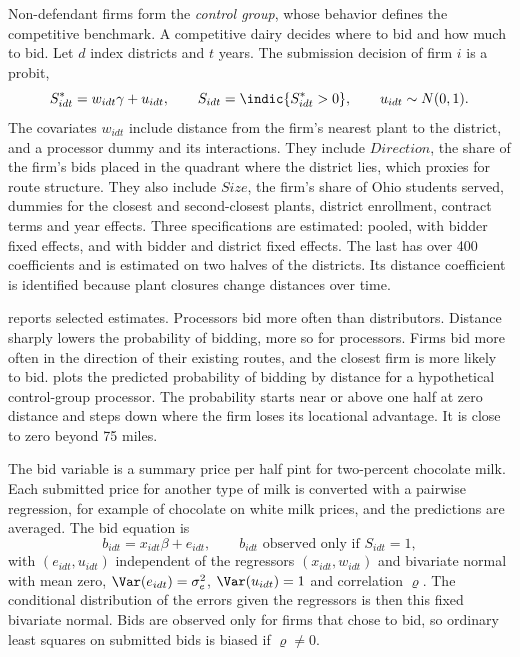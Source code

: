 Non-defendant firms form the \emph{control group}, whose behavior defines the competitive benchmark. A competitive
dairy decides where to bid and how much to bid. Let $d$ index districts and $t$ years. The submission decision of
firm $i$ is a probit,
\begin{equation}\label{eq:13-pz99-probit}
  S^*_{idt} = w_{idt}\gamma + u_{idt}, \qquad S_{idt} = \indic\{S^*_{idt} > 0\}, \qquad u_{idt} \sim N(0,1) .
\end{equation}
The covariates $w_{idt}$ include distance from the firm's nearest plant to the district, and a processor dummy and
its interactions. They include $\mathit{Direction}$, the share of the firm's bids placed in the quadrant where the
district lies, which proxies for route structure. They also include $\mathit{Size}$, the firm's share of Ohio
students served, dummies for the closest and second-closest plants, district enrollment, contract terms and year
effects. Three
specifications are estimated: pooled, with bidder fixed effects, and with bidder and district fixed effects. The
last has over 400 coefficients and is estimated on two halves of the districts. Its distance coefficient is
identified because plant closures change distances over time.

 reports selected estimates. Processors bid more often than distributors. Distance sharply
lowers the probability of bidding, more so for processors. Firms bid more often in the direction of their existing
routes, and the closest firm is more likely to bid.  plots the predicted probability of bidding
by distance for a hypothetical control-group processor. The probability starts near or above one half at zero
distance and steps down where the firm loses its locational advantage. It is close to zero beyond 75 miles.

The bid variable is a summary price per half pint for two-percent chocolate milk. Each submitted price for another
type of milk is converted with a pairwise regression, for example of chocolate on white milk prices, and the
predictions are averaged. The bid equation is
\begin{equation}\label{eq:13-pz99-bid}
  b_{idt} = x_{idt}\beta + e_{idt}, \qquad b_{idt} \text{ observed only if } S_{idt} = 1 ,
\end{equation}
with $(e_{idt}, u_{idt})$ independent of the regressors $(x_{idt}, w_{idt})$ and bivariate normal with mean zero,
$\Var(e_{idt}) = \sigma_e^2$, $\Var(u_{idt}) = 1$ and correlation $\varrho$. The conditional distribution of the
errors given the regressors is then this fixed bivariate normal. Bids are observed only for firms that chose to bid,
so ordinary least squares on submitted bids is biased if $\varrho \neq 0$.

